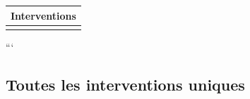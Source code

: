 \documentclass[
  french,
  11pt,
  a4paper,
]{scrartcl}
\begin{document}
\begin{longtable}[]{@{}l@{}}
\toprule\noalign{}
Interventions \\
\midrule\noalign{}
\endhead
\bottomrule\noalign{}
\endlastfoot
 \\
\end{longtable}

```


\subsection{Toutes les interventions
uniques}\label{toutes-les-interventions-uniques}
\end{document}
